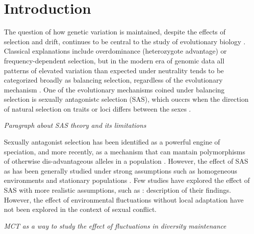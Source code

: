 \documentclass[../main.tex]{subfiles}
\begin{document}
\section{Introduction}

The question of how genetic variation is maintained, despite the effects of selection and drift, continues to be central to the study of evolutionary biology \citep{walsh_evolution_2018}. Classical explanations include overdominance (heterozygote advantage) or frequency-dependent selection, but in the modern era of genomic data all patterns of elevated variation than expected under neutrality tends to be categorized broadly as balancing selection, regardless of the evolutionary mechanism \citep{mitchell-olds_which_2007}.  One of the evolutionary mechanisms coined under balancing selection is sexually antagonistc selection (SAS), which ouccrs when the direction of natural selection on traits or loci differs between the sexes \citep{connallon2018environmental}.

\textit{Paragraph about SAS theory and its limitations}

Sexually antagonist selection has been identified as a powerful engine of speciation, and more recently, as a mechanism that can mantain polymorphisms of otherwise dis-advantageous alleles in a population  \citep{connallon_evolutionary_2018, gavrilets2014sexual}. However, the effect of SAS as has been generally studied under strong assumptions such as homogeneous environments and stationary populations \citep{}. Few studies have explored the effect of SAS with more realistic assumptions, such as \citet{connallon_evolutionary_2018} : description of their findings. However, the effect of environmental fluctuations without local adaptation have not been explored in the context of sexual conflict.

\textit{MCT as a way to study the effect of fluctuations in diversity maintenance}
\end{document}

